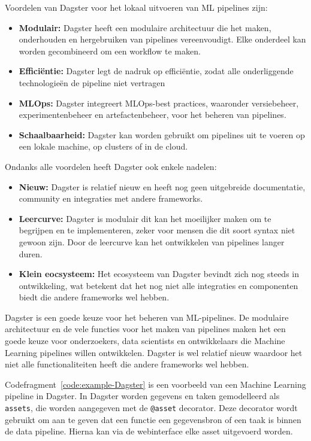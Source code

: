 Voordelen van Dagster voor het lokaal uitvoeren van ML pipelines zijn:
\begin{itemize}
    \item \textbf{Modulair:} Dagster heeft een modulaire architectuur die het maken, onderhouden en hergebruiken van pipelines vereenvoudigt. Elke onderdeel kan worden gecombineerd om een workflow te maken.
    \item \textbf{Efficiëntie:} Dagster legt de nadruk op efficiëntie, zodat alle onderliggende technologieën de pipeline niet vertragen
    \item \textbf{MLOps:} Dagster integreert MLOps-best practices, waaronder versiebeheer, experimentenbeheer en artefactenbeheer, voor het beheren van pipelines.
    \item \textbf{Schaalbaarheid:} Dagster kan worden gebruikt om pipelines uit te voeren op een lokale machine, op clusters of in de cloud.
\end{itemize}
Ondanks alle voordelen heeft Dagster ook enkele nadelen:
\begin{itemize}
    \item \textbf{Nieuw:} Dagster is relatief nieuw en heeft nog geen uitgebreide documentatie, community en integraties met andere frameworks.
    \item \textbf{Leercurve:} Dagster is modulair dit kan het moeilijker maken om te begrijpen en te implementeren, zeker voor mensen die dit soort syntax niet gewoon zijn. Door de leercurve kan het ontwikkelen van pipelines langer duren.
    \item \textbf{Klein eocsysteem:} Het ecosysteem van Dagster bevindt zich nog steeds in ontwikkeling, wat betekent dat het nog niet alle integraties en componenten biedt die andere frameworks wel hebben.
\end{itemize}
Dagster is een goede keuze voor het beheren van ML-pipelines. De modulaire architectuur en de vele functies voor het maken van pipelines maken het een goede keuze voor onderzoekers, data scientists en ontwikkelaars die Machine Learning pipelines willen ontwikkelen. Dagster is wel relatief nieuw waardoor het niet alle functionaliteiten heeft die andere frameworks wel hebben.

Codefragment~\ref{code:example-Dagster} is een voorbeeld van een Machine Learning pipeline in Dagster. In Dagster worden gegevens en taken gemodelleerd als \texttt{assets}, die worden aangegeven met de \texttt{@asset} decorator. Deze decorator wordt gebruikt om aan te geven dat een functie een gegevensbron of een taak is binnen de data pipeline. Hierna kan via de webinterface elke asset uitgevoerd worden.

